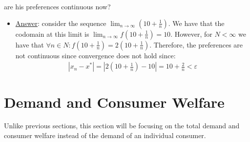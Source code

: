 \documentclass{article}
\begin{document}
\begin{itemize}
  are his preferences continuous now?
  \begin{itemize}
    \item  \underline{Answer}: consider the sequence $\lim_{n \rightarrow \infty} (10 + \tfrac{1}{n})$. We have that the codomain at this limit is $\lim_{n \rightarrow \infty} f(10 + \tfrac{1}{n}) = 10$. However, for $N < \infty$ we have that $\forall n \in N: f(10 + \tfrac{1}{n}) = 2(10 + \tfrac{1}{n})$. Therefore, the preferences are not continuous since convergence does not hold since:
    \begin{gather*}
      |x_{n} - x^{*}| = |2(10 + \frac{1}{n}) - 10| = 10 + \frac{2}{n} < \varepsilon
    \end{gather*}
  \end{itemize}
\end{itemize}

\newpage

\vspace{2.5mm}
\section{Demand and Consumer Welfare}
Unlike previous sections, this section will be focusing on the total demand and consumer welfare instead of the demand of an individual consumer. \par
\vspace{6mm}
\end{document}
